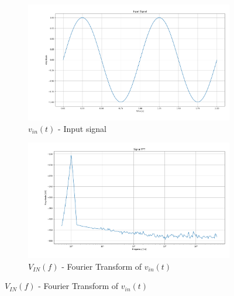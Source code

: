 \begin{figure}[h]
    \centering

    \begin{subfigure}[b]{0.4\textwidth}
        \centering
        \includegraphics[width=\textwidth]{Images/Vin_tempo_ideal.png}
        \caption{$v_{in}(t)$ - Input signal}
        \label{fig:Vin_tempo_ideal}
    \end{subfigure}%
    \begin{subfigure}[b]{0.4\textwidth}
        \centering
        \includegraphics[width=\textwidth]{Images/Vin_ideal.png}
        \caption{$V_{IN}(f)$ - Fourier Transform of $v_{in}(t)$}
        \label{fig:Vin_freq_ideal}
    \end{subfigure}


\end{figure}
